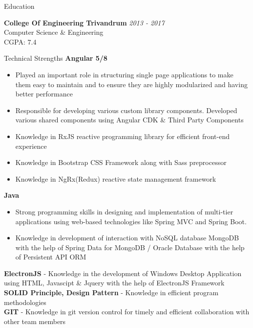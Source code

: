 \documentclass{resume} %
\begin{document}

\begin{rSection}{Education}

{\bf College Of Engineering Trivandrum} \hfill {\em 2013 - 2017} 
\\ Computer Science \& Engineering
\\ CGPA: 7.4



\end{rSection}




\begin{rSection}{Technical Strengths}
{\bf Angular 5/8}
\begin{itemize}
    \item Played an important role in structuring single page applications to make them easy to maintain and to ensure they are highly modularized and having better performance
    \item Responsible for developing various custom library components. Developed various shared components using Angular CDK \& Third Party Components
    \item Knowledge in RxJS reactive programming library for efficient front-end experience
    \item Knowledge in Bootstrap CSS Framework along with Sass preprocessor
   \item Knowledge in NgRx(Redux) reactive state management framework
\end{itemize}

{\bf Java}
\begin{itemize}
    \item Strong programming skills in designing and implementation of multi-tier applications using web-based technologies like Spring MVC and Spring Boot.
    \item Knowledge in  development of interaction with NoSQL database MongoDB with the help of Spring Data for MongoDB / Oracle Database with the help of Persistent API ORM
\end{itemize}
{\bf ElectronJS} - {Knowledge in the development of Windows Desktop Application using HTML, Javascipt \& Jquery with the help of ElectronJS Framework }
        \newline
{\bf SOLID Principle, Design Pattern} - {Knowledge in efficient program methodologies}
\\
{\bf GIT } - {Knowledge in git version control for timely and efficient collaboration with other team members }
\end{rSection}
\end{document}

